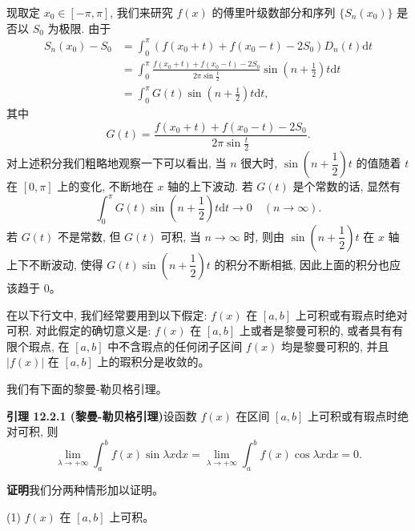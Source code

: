 \documentclass[UTF8, 12pt, fontset=fandol, oneside]{ctexart}
\begin{document}
现取定 $x_0\in[-\pi,\pi]$, 我们来研究 $f(x)$ 的傅里叶级数部分和序列 $\{S_n(x_0)\}$ 是否以 $S_0$ 为极限. 由于
\[
\begin{aligned}
  S_n(x_0)-S_0
  &=\int_0^\pi (f(x_0+t)+f(x_0-t)-2S_0)D_n(t)\mathrm dt\\
  &=\int_0^\pi\frac{f(x_0+t)+f(x_0-t)-2S_0}{2\pi\sin\frac t2}
    \sin\left(n+\frac12\right)t\mathrm dt\\
  &=\int_0^\pi G(t)\sin\left(n+\frac12\right)t\mathrm dt,
\end{aligned}
\]
其中
\begin{equation}
  G(t)=\frac{f(x_0+t)+f(x_0-t)-2S_0}{2\pi\sin\frac t2}.
  \tag{12.2.1}
\end{equation}
对上述积分我们粗略地观察一下可以看出, 当 $n$ 很大时, $\sin\left(n+\dfrac12\right)t$ 的值随着 $t$ 在 $[0,\pi]$ 上的变化, 不断地在 $x$ 轴的上下波动. 若 $G(t)$ 是个常数的话, 显然有
\[
  \int_0^\pi G(t)\sin\left(n+\frac12\right)t\mathrm dt\to0
  \quad (n\to\infty).
\]
若 $G(t)$ 不是常数, 但 $G(t)$ 可积, 当 $n\to\infty$ 时, 则由 $\sin\left(n+\dfrac12\right)t$ 在 $x$ 轴上下不断波动, 使得 $G(t)\sin\left(n+\dfrac12\right)t$ 的积分不断相抵, 因此上面的积分也应该趋于 $0$。

在以下行文中, 我们经常要用到以下假定: $f(x)$ 在 $[a,b]$ 上可积或有瑕点时绝对可积. 对此假定的确切意义是: $f(x)$ 在 $[a,b]$ 上或者是黎曼可积的, 或者具有有限个瑕点, 在 $[a,b]$ 中不含瑕点的任何闭子区间 $f(x)$ 均是黎曼可积的, 并且 $|f(x)|$ 在 $[a,b]$ 上的瑕积分是收敛的。

我们有下面的黎曼-勒贝格引理。

\noindent\textbf{引理 12.2.1 (黎曼-勒贝格引理)}\quad 设函数 $f(x)$ 在区间 $[a,b]$ 上可积或有瑕点时绝对可积, 则
\[
  \lim_{\lambda\to+\infty}\int_a^b f(x)\sin\lambda x\mathrm dx
  =\lim_{\lambda\to+\infty}\int_a^b f(x)\cos\lambda x\mathrm dx=0.
\]

\noindent\textbf{证明}\quad 我们分两种情形加以证明。

(1) $f(x)$ 在 $[a,b]$ 上可积。
\end{document}
